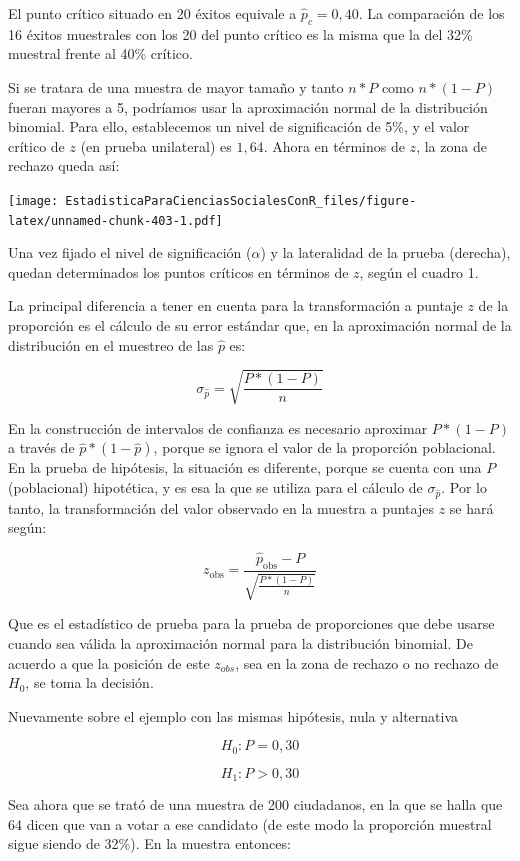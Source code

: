 \documentclass[]{book}
\begin{document}
El punto crítico situado en 20 éxitos equivale a
\({\widehat{p}}_{c} = 0,40\). La comparación de los 16 éxitos muestrales
con los 20 del punto crítico es la misma que la del 32\% muestral frente
al 40\% crítico.

Si se tratara de una muestra de mayor tamaño y tanto \(n*P\) como
\(n*(1 - P)\) fueran mayores a 5, podríamos usar la aproximación normal de
la distribución binomial. Para ello, establecemos un nivel de
significación de 5\%, y el valor crítico de \(z\) (en prueba unilateral) es \(1,64\). Ahora en términos de \(z\), la zona de rechazo queda así:

\texttt{[image: EstadisticaParaCienciasSocialesConR\_files/figure-latex/unnamed-chunk-403-1.pdf]}

Una vez fijado el nivel de significación (\(\alpha\)) y la lateralidad de la prueba (derecha), quedan determinados los puntos críticos en términos de \(z\), según el cuadro 1.

La principal diferencia a tener en cuenta para la transformación a
puntaje \(z\) de la proporción es el cálculo de su error estándar que, en
la aproximación normal de la distribución en el muestreo de las
\(\widehat{p}\) es:

\[\sigma_{\widehat{p}} = \sqrt{\frac{P*(1 - P)}{n}}\]

En la construcción de intervalos de confianza es necesario aproximar
\(P*(1 - P)\) a través de \(\widehat{p}*(1 - \widehat{p})\), porque se
ignora el valor de la proporción poblacional. En la prueba de hipótesis, la situación es diferente, porque se cuenta con una \(P\) (poblacional) hipotética, y es esa la que se utiliza para el cálculo de
\(\sigma_{\widehat{p}}\). Por lo tanto, la transformación del valor
observado en la muestra a puntajes \(z\) se hará según:

\[z_{\text{obs}} = \frac{{\widehat{p}}_{\text{obs}} - P}{\sqrt{\frac{P*(1 - P)}{n}}}\]

Que es el estadístico de prueba para la prueba de proporciones que debe
usarse cuando sea válida la aproximación normal para la distribución
binomial. De acuerdo a que la posición de este \(z_{obs}\), sea en la zona de rechazo o no rechazo de \(H_{0}\), se toma la decisión.

Nuevamente sobre el ejemplo con las mismas hipótesis, nula y alternativa

\[H_{0}:P = 0,30\]

\[H_{1}:P > 0,30\]

Sea ahora que se trató de una muestra de 200 ciudadanos, en la que se
halla que 64 dicen que van a votar a ese candidato (de este modo la
proporción muestral sigue siendo de 32\%). En la muestra entonces:
\end{document}
